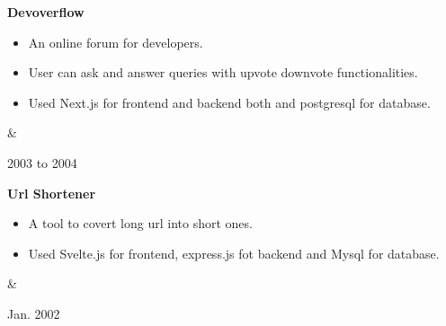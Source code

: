 \documentclass[10pt, letterpaper]{article}
\newenvironment{highlights}{
        \begin{itemize}[
                topsep=0pt,
                parsep=0.10 cm,
                partopsep=0pt,
                itemsep=0pt,
                after=\vspace{-1\baselineskip},
                leftmargin=0.4 cm + 3pt
            ]
    }{
        \end{itemize}
    } %
\let\originalTabularx\tabularx
\let\originalEndTabularx\endtabularx
\renewenvironment{tabularx}{\bgroup\centering\originalTabularx}{\originalEndTabularx\par\egroup}
\begin{document}
        \vspace{0.2 cm}
        \begin{tabularx}{
            \textwidth-0.4 cm-0.13cm
        }{
            K{0.2 cm}
            R{4.1 cm}
        }
            \textbf{Devoverflow}

            \vspace{0.10 cm}

            \begin{highlights}
                \item An online forum for developers.
                \item User can ask and answer queries with upvote downvote functionalities.
                \item Used Next.js for frontend and backend both and postgresql for database.
            \end{highlights}
            &
            

            2003 to 2004
        \end{tabularx}


        \vspace{0.2 cm}
        \begin{tabularx}{
            \textwidth-0.4 cm-0.13cm
        }{
            K{0.2 cm}
            R{4.1 cm}
        }
            \textbf{Url Shortener}

            \vspace{0.10 cm}

            \begin{highlights}
                \item A tool to covert long url into short ones.
                \item Used Svelte.js for frontend, express.js fot backend and Mysql for database.
            \end{highlights}
            &
            

            Jan. 2002
        \end{tabularx}
\end{document}

